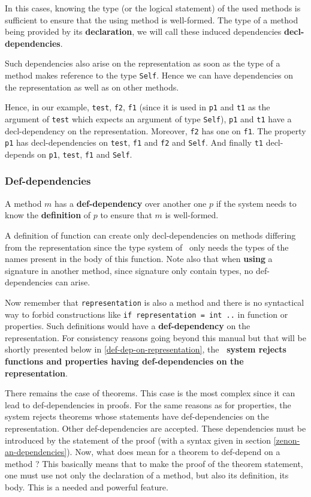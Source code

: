 In this cases, knowing the type (or the logical statement) of the used
methods is sufficient to ensure that the using method is
well-formed. The type of a method being provided by its
{\bf declaration}, we will call these induced dependencies
{\bf decl-dependencies}.

Such dependencies also arise on the representation as soon as the type
of a method makes reference to the type {\tt Self}. Hence we can have
dependencies on the representation as well as on other methods.

Hence, in our example, {\tt test}, {\tt f2}, {\tt f1} (since it is
used in {\tt p1} and {\tt t1} as the argument of {\tt test} which expects
an argument of type {\tt Self}), {\tt p1} and {\tt t1} have a
decl-dependency on the representation. Moreover, {\tt f2} has one on
{\tt f1}. The property {\tt p1} has decl-dependencies on {\tt test},
{\tt f1} and {\tt f2} and {\tt Self}. And finally {\tt t1}
decl-depends on {\tt p1}, {\tt test}, {\tt f1} and {\tt Self}.



\subsubsection{Def-dependencies}
\label{def-dependency}
A method $m$ has a 
{\bf def-dependency} over another one $p$ if the system needs to
know the {\bf definition} of $p$   to ensure that $m$ is well-formed.

A definition of function can create  only decl-dependencies on
methods differing from the representation since the type system of
\focal\ only needs the types of the names present in the body of this
function. Note also that when {\bf using} a signature in another
method, since signature only contain types, no def-dependencies can
arise.

Now remember that {\tt representation} is also a method and there is
no syntactical way to forbid constructions like {\tt if representation
  = int ..} in function or properties. Such definitions would have a
{\bf def-dependency} on the representation.  For consistency reasons going beyond this manual
but that will be shortly presented below in
\ref{def-dep-on-representation}, the {\bf \focal\ system rejects
  functions and properties having def-dependencies on the
  representation}.

\smallskip There remains the case of theorems. This case is the most
complex since it can lead to def-dependencies in proofs.  For the same
reasons as for properties, the {\bf \focal} system rejects theorems
whose statements have def-dependencies on the representation. Other
def-dependencies are accepted.  These dependencies must be introduced
by the statement of the proof (with a syntax given in section
\ref{zenon-an-dependencies}).  Now, what does mean for a theorem to
def-depend on a method ? This basically means that to make the proof
of the theorem statement, one must use not only the declaration of a
method, but also its definition, its body. This is a needed and powerful
feature.




